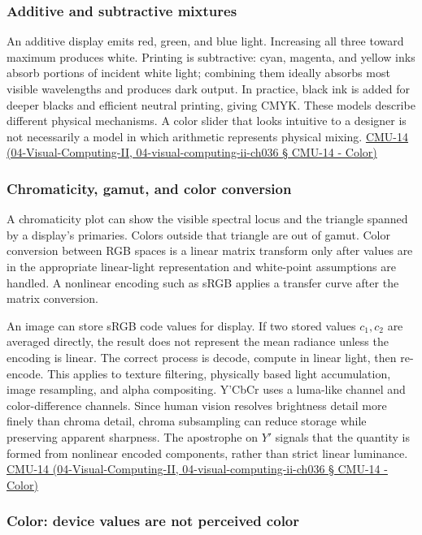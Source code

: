 \subsubsection{Additive and subtractive mixtures}\label{additive-and-subtractive-mixtures}

An additive display emits red, green, and blue light. Increasing all three toward maximum produces white. Printing is subtractive: cyan, magenta, and yellow inks absorb portions of incident white light; combining them ideally absorbs most visible wavelengths and produces dark output. In practice, black ink is added for deeper blacks and efficient neutral printing, giving CMYK. These models describe different physical mechanisms. A color slider that looks intuitive to a designer is not necessarily a model in which arithmetic represents physical mixing. \href{}{CMU-14 (04-Visual-Computing-II, 04-visual-computing-ii-ch036 § CMU-14 - Color)}

\subsubsection{Chromaticity, gamut, and color conversion}\label{chromaticity-gamut-and-color-conversion}

A chromaticity plot can show the visible spectral locus and the triangle spanned by a display's primaries. Colors outside that triangle are out of gamut. Color conversion between RGB spaces is a linear matrix transform only after values are in the appropriate linear-light representation and white-point assumptions are handled. A nonlinear encoding such as sRGB applies a transfer curve after the matrix conversion.

An image can store sRGB code values for display. If two stored values \(c_1,c_2\) are averaged directly, the result does not represent the mean radiance unless the encoding is linear. The correct process is decode, compute in linear light, then re-encode. This applies to texture filtering, physically based light accumulation, image resampling, and alpha compositing. Y'CbCr uses a luma-like channel and color-difference channels. Since human vision resolves brightness detail more finely than chroma detail, chroma subsampling can reduce storage while preserving apparent sharpness. The apostrophe on \(Y'\) signals that the quantity is formed from nonlinear encoded components, rather than strict linear luminance. \href{}{CMU-14 (04-Visual-Computing-II, 04-visual-computing-ii-ch036 § CMU-14 - Color)}

\subsubsection{Color: device values are not perceived color}\label{color-device-values-are-not-perceived-color}

